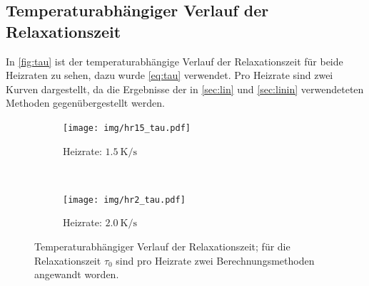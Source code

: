 \subsection{Temperaturabhängiger Verlauf der Relaxationszeit}

In \autoref{fig:tau} ist der temperaturabhängige Verlauf der Relaxationszeit für beide Heizraten zu sehen, dazu wurde \autoref{eq:tau} verwendet. Pro Heizrate sind zwei Kurven dargestellt, da die Ergebnisse der in \autoref{sec:lin} und \autoref{sec:linin} verwendeteten Methoden gegenübergestellt werden.

\begin{figure}[htp]
    \centering
    \begin{subfigure}[t]{0.5\textwidth}
        \centering
        \texttt{[image: img/hr15\_tau.pdf]}
        \caption{Heizrate: $\SI{1.5}{\kelvin\per\second}$}
    \end{subfigure}%
    ~
    \begin{subfigure}[t]{0.5\textwidth}
        \centering
        \texttt{[image: img/hr2\_tau.pdf]}
        \caption{Heizrate: $\SI{2.0}{\kelvin\per\second}$}
    \end{subfigure}
    \caption{Temperaturabhängiger Verlauf der Relaxationszeit; für die Relaxationszeit $\tau_0$ sind  pro Heizrate zwei Berechnungsmethoden angewandt worden.}
    \label{fig:tau}
\end{figure}
